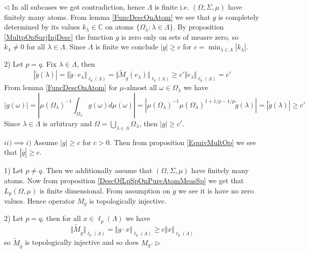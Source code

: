 \documentclass[12pt]{article}
\newenvironment{proof}{\par $\triangleleft$}{$\triangleright$}
\begin{document}
\begin{proof}
In all subcases we got contradiction, hence $\Lambda$ is finite i.e.  $(\Omega,\Sigma,\mu)$ have finitely many atoms. From lemma \ref{FuncDescOnAtom} we see that $g$ is completely determined by its values $k_\lambda\in\mathbb{C}$ on atoms $\{\Omega_\lambda:\lambda\in\Lambda\}$. By proposition \ref{MultpOpSurjInjDesc} the function $g$ is zero only on sets of measre zero, so $k_\lambda\neq 0$ for all $\lambda\in\Lambda$. Since $\Lambda$ is finite we conclude $|g|\geq c$ for $c=\min_{\lambda\in\Lambda}|k_\lambda|$.


2) Let $p=q$. Fix $\lambda\in\Lambda$, then
$$
|\widetilde{g}(\lambda)|
=\Vert \widetilde{g}\cdot e_\lambda\Vert_{\ell_q(\Lambda)}
=\Vert \widetilde{M}_{\widetilde{g}}(e_\lambda)\Vert_{\ell_q(\Lambda)}
\geq c'\Vert e_\lambda\Vert_{\ell_p(\Lambda)}
=c'
$$
From lemma \ref{FuncDescOnAtom} for $\mu$-almost all $\omega\in\Omega_\lambda$ we have
$$
|g(\omega)|
=\left|\mu(\Omega_\lambda)^{-1}\int_{\Omega_\lambda}g(\omega)d\mu(\omega)\right|
=\left|\mu(\Omega_\lambda)^{-1}\mu(\Omega_\lambda)^{1+1/p-1/p}\widetilde{g}(\lambda)\right|
=|\widetilde{g}(\lambda)|\geq c'
$$
Since $\lambda\in\Lambda$ is arbitrary and $\Omega=\bigcup_{\lambda\in\Lambda}\Omega_\lambda$, then $|g|\geq c'$.



$ii)\implies i)$ Assume $|g|\geq c$ for $c>0$. Then from proposition \ref{EquivMultOp} we see that $|\widetilde{g}|\geq c$.

1) Let $p\neq q$. Then we additionally assume that $(\Omega,\Sigma,\mu)$ have finitely many atoms. Now from proposition \ref{DescOfLpSpOnPureAtomMeasSp} we get that $L_p(\Omega,\mu)$ is finite dimensional. From assumption on $g$ we see it is have no zero values. Hence operator $M_g$ is topologically injective.

2) Let $p=q$, then for all $x\in\ell_p(\Lambda)$ we have
$$
\Vert \widetilde{M}_{\widetilde{g}}\Vert_{\ell_p(\Lambda)}=\Vert g\cdot x\Vert_{\ell_p(\Lambda)}\geq c\Vert x\Vert_{\ell_p(\Lambda)}
$$
so $\widetilde{M}_{\widetilde{g}}$ is topologically injective and so does $M_g$.
\end{proof}
\end{document}
